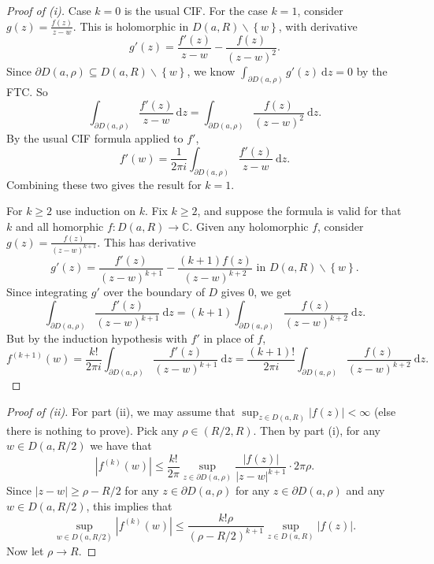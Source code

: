 \documentclass[egregdoesnotlikesansseriftitles,a4paper]{scrartcl}
\begin{document}
\begin{proof}[Proof of (i)]
     Case $k=0 $ is the usual CIF. For the case $k=1$, consider $g (z)= \frac{f (z)}{z-w}$. This is holomorphic in $D (a,R)\backslash \left\{w\right\}$, with derivative \[
     g' (z)= \frac{f' (z)}{z-w}- \frac{f (z)}{(z-w)^2}
     .\] Since $\partial D (a,\rho)\subseteq D (a,R) \backslash \left\{w\right\}$, we know $\int_{\partial D (a,\rho)}^{}g' (z) \ \mathrm{d}z =0 $ by the FTC. So \[
        \int_{\partial D (a,\rho)}^{} \frac{f' (z)}{z-w} \ \mathrm{d}z=\int_{\partial D (a,\rho)}^{} \frac{f (z)}{(z-w)^2} \ \mathrm{d}z
     .\] By the usual CIF formula applied to $f'$, \[
     f' (w)=\frac{1}{2\pi i} \int_{\partial D (a,\rho)}^{} \frac{f' (z)}{z-w} \ \mathrm{d}z 
     .\] Combining these two gives the result for $k=1$.
     
     For $k \geq 2$ use induction on $k$. Fix $k \geq 2$, and suppose the formula is valid for that $k$ and all homorphic $f: D (a,R)\rightarrow \mathbb{C}$. Given any holomorphic $f$, consider $g (z)= \frac{f (z)}{(z-w)^{k+1}}$. This has derivative \[
     g' (z)= \frac{f' (z)}{(z-w)^{k+1}}- \frac{(k+1)f (z)}{(z-w)^{k+2}} \text{ in } D (a,R)\backslash \left\{w\right\}
     .\] Since integrating $g'$ over the boundary of $D$ gives 0, we get \[
     \int_{\partial D (a,\rho)}^{} \frac{f' (z)}{(z-w)^{k+1}} \ \mathrm{d}z = (k+1)\int_{\partial D (a,\rho)}^{} \frac{f (z)}{(z-w)^{k+2}} \ \mathrm{d}z 
     .\] But by the induction hypothesis with $f'$ in place of $f$, \[
     f^{(k+1)}(w)= \frac{k! }{2\pi i} \int_{\partial D (a,\rho)}^{} \frac{f' (z)}{(z-w)^{k+1}} \ \mathrm{d}z = \frac{(k+1)! }{2\pi i}\int_{\partial D (a,\rho)}^{} \frac{f (z)}{(z-w)^{k+2}} \ \mathrm{d}z 
     .\]
\end{proof}
\begin{proof}[Proof of (ii)]
     For part (ii), we may assume that $\sup_{z \in D (a,R)} \left|f (z)\right|< \infty$ (else there is nothing to prove). Pick any $\rho \in (R/2, R)$. Then by part (i), for any $w \in D (a,R/2)$ we have that \[
     \left|f^{(k)}(w)\right|\leq \frac{k! }{2\pi} \sup_{z \in \partial D (a,\rho)} \frac{\left|f (z)\right|}{\left|z-w\right|^{k+1}} \cdot 2\pi \rho
     .\] Since $\left|z-w\right|\geq \rho-R/2$ for any $z \in \partial D (a,\rho)$ for any $z \in \partial D (a,\rho)$ and any $w \in D (a,R/2)$, this implies that \[
     \sup_{w \in D (a,R/2)}\left|f^{(k)}(w)\right|\leq \frac{k! \rho }{(\rho-R/2)^{k+1}}\sup_{z \in D (a,R)}\left|f (z)\right|
     .\] Now let $\rho \rightarrow R$.
 \end{proof}
\end{document}
